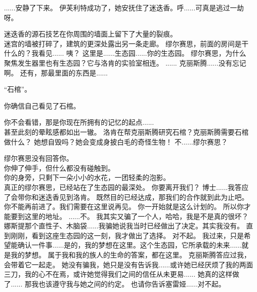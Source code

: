 \documentclass[openany]{book}
\begin{document}
\begin{dialogue}
     ......安静了下来。
     伊芙利特成功了，她安抚住了迷迭香。呼......可真是逃过一劫呀。\par
    迷迭香的源石技艺在你周围的墙面上留下了大量的裂痕。\\
    迷宫的墙被打碎了，建筑的更深处露出另一条走廊。
     缪尔赛思，前面的房间是干什么的？我看见......
     咦？
     这里是......生态园......你的生态园。
     缪尔赛思，为什么聚焦发生器里也有生态园？它与洛肯的实验室相连。
     ......
     克丽斯腾......没有忘记啊。
     还有，那最里面的东西是......\par
    “石棺”。\par
    你确信自己看见了石棺。\par
    你不会看错，那是你现在所拥有的记忆的起点......\\
    甚至此刻的晕眩感都如出一辙。
     洛肯在帮克丽斯腾研究石棺？克丽斯腾需要石棺做什么？
     她想自毁吗？她会变成身披白毛的奇怪生物！
     不......缪尔赛思？\par
    缪尔赛思没有回答你。\\
    你伸了伸手，但什么都没有碰触到。\\
    你的身旁，只剩下一朵小小的水花，一团轻柔的泡影。\\
    真正的缪尔赛思，已经站在了生态园的最深处。
     你要离开我们？
     博士......我答应了会带你和迷迭香见到洛肯。
     既然目的已经达成，那我们的合作就到此为止吧。
     你不能再前进了。我们需要在这里说再见。
     你一开始就是这么计划的。
     所以你才能要到这里的地址。
     ......不。
     我其实又骗了一个人，哈哈，我是不是真的很坏？
     娜斯提那个直性子、木脑袋......我骗她说我当时已经做出了决定。其实我没有。
     直到刚刚，看到这座生态园的这一刻，我才做出了选择。
     对不起。
     我过来，只是希望能确认一件事......是的，我的梦想在这里。这个生态园，它所承载的未来......就是我的梦想。
     属于我和我的族人的生命的答案，都在这里。
     克丽斯腾答应过我，会带着它一起走。
     她没有骗我，她只是没有告诉我......或许她已经厌烦了我的两面三刀，我的心不在焉，或许她觉得我们之间的信任从未更易......
     她真的这样做了......
     那我也该遵守我与她之间的约定。
     也请你告诉塞雷娅......对不起。
\end{dialogue}\par
\end{document}
